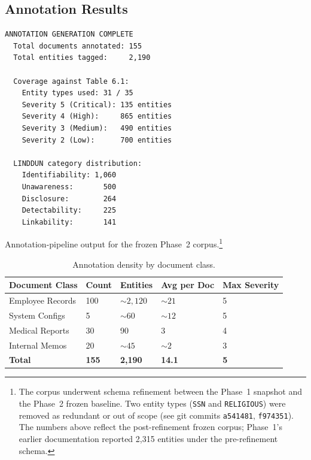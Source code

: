 \documentclass[12pt, a4paper]{article}
\begin{document}
\subsection{Annotation Results}

\begin{resultbox}
\begin{lstlisting}[style=termstyle]
ANNOTATION GENERATION COMPLETE
  Total documents annotated: 155
  Total entities tagged:     2,190

  Coverage against Table 6.1:
    Entity types used: 31 / 35
    Severity 5 (Critical): 135 entities
    Severity 4 (High):     865 entities
    Severity 3 (Medium):   490 entities
    Severity 2 (Low):      700 entities

  LINDDUN category distribution:
    Identifiability: 1,060
    Unawareness:       500
    Disclosure:        264
    Detectability:     225
    Linkability:       141
\end{lstlisting}
\end{resultbox}

\noindent\footnotesize Annotation-pipeline output for the frozen Phase~2 corpus.\footnote{The corpus underwent schema refinement between the Phase~1 snapshot and the Phase~2 frozen baseline. Two entity types (\texttt{SSN} and \texttt{RELIGIOUS}) were removed as redundant or out of scope (see git commits \texttt{a541481}, \texttt{f974351}). The numbers above reflect the post-refinement frozen corpus; Phase~1's earlier documentation reported 2{,}315 entities under the pre-refinement schema.}\normalsize

\begin{table}[H]
\centering
\caption{Annotation density by document class.}
\label{tab:annotation-density}
\small
{}
\begin{tabular}{L{3.5cm} C{2cm} C{2cm} C{2.5cm} C{2.5cm}}
\toprule
{}
\color{white}\textbf{Document Class} &
\color{white}\textbf{Count} &
\color{white}\textbf{Entities} &
\color{white}\textbf{Avg per Doc} &
\color{white}\textbf{Max Severity} \\
\midrule
Employee Records & 100 & ${\sim}2{,}120$ & ${\sim}21$ & 5 \\
System Configs   & 5   & ${\sim}60$      & ${\sim}12$ & 5 \\
Medical Reports  & 30  & 90              & 3          & 4 \\
Internal Memos   & 20  & ${\sim}45$      & ${\sim}2$  & 3 \\
\midrule
\textbf{Total}   & \textbf{155} & \textbf{2{,}190} & \textbf{14.1} & \textbf{5} \\
\bottomrule
\end{tabular}
\end{table}
\end{document}
